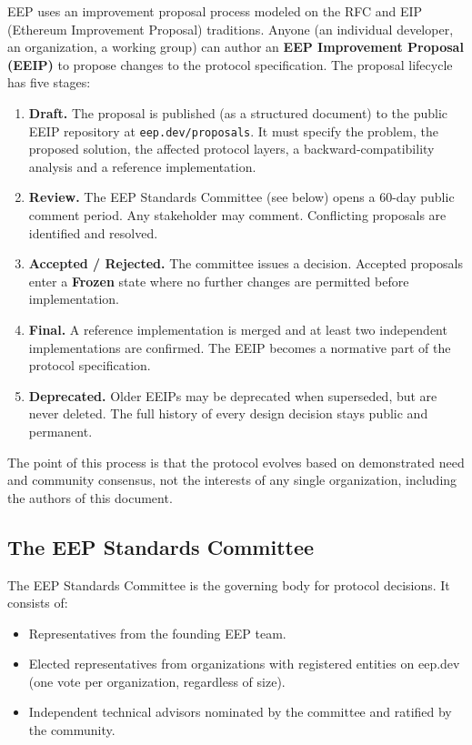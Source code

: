 \documentclass[12pt,a4paper]{article}
\begin{document}
EEP uses an improvement proposal process modeled on the RFC and EIP (Ethereum Improvement Proposal) traditions. Anyone (an individual developer, an organization, a working group) can author an \textbf{EEP Improvement Proposal (EEIP)} to propose changes to the protocol specification. The proposal lifecycle has five stages:

\begin{enumerate}
    \item \textbf{Draft.} The proposal is published (as a structured document) to the public EEIP repository at \texttt{eep.dev/proposals}. It must specify the problem, the proposed solution, the affected protocol layers, a backward-compatibility analysis and a reference implementation.
    \item \textbf{Review.} The EEP Standards Committee (see below) opens a 60-day public comment period. Any stakeholder may comment. Conflicting proposals are identified and resolved.
    \item \textbf{Accepted / Rejected.} The committee issues a decision. Accepted proposals enter a \textbf{Frozen} state where no further changes are permitted before implementation.
    \item \textbf{Final.} A reference implementation is merged and at least two independent implementations are confirmed. The EEIP becomes a normative part of the protocol specification.
    \item \textbf{Deprecated.} Older EEIPs may be deprecated when superseded, but are never deleted. The full history of every design decision stays public and permanent.
\end{enumerate}

The point of this process is that the protocol evolves based on demonstrated need and community consensus, not the interests of any single organization, including the authors of this document.

\subsection{The EEP Standards Committee}

The EEP Standards Committee is the governing body for protocol decisions. It consists of:

\begin{itemize}
    \item Representatives from the founding EEP team.
    \item Elected representatives from organizations with registered entities on eep.dev (one vote per organization, regardless of size).
    \item Independent technical advisors nominated by the committee and ratified by the community.
\end{itemize}
\end{document}
